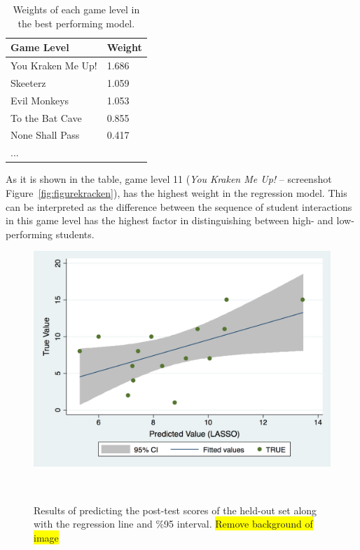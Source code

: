 \documentclass{sigchi}
\newcommand{\hl}[1]{\colorbox{yellow}{#1}}
\begin{document}
\begin{table}[b]
	\centering
	\begin{tabular}{ll}
		\hline
		\textbf{Game Level} & \textbf{Weight} \\ \hline
		You Kraken Me Up!   & 1.686                               \\
		Skeeterz            & 1.059                               \\
		Evil Monkeys        & 1.053                               \\
		To the Bat Cave     & 0.855                               \\
		None Shall Pass     & 0.417                               \\
		...                 &                                    
	\end{tabular}
	\caption{Weights of each game level in the best performing model.}
	\label{tab:regrweights}	
\end{table}

As it is shown in the table, game level 11 (\textit{You Kraken Me Up!} -- screenshot Figure~\ref{fig:figurekracken}), has the highest weight in the regression model. This can be interpreted as the difference between the sequence of student interactions in this game level has the highest factor in distinguishing between high- and low-performing students. 

\begin{figure}
	\centering
	\includegraphics[width=0.9\columnwidth]{figures/regression.png}
	\caption{Results of predicting the post-test scores of the held-out set along with the regression line and \%95 interval. \hl{Remove background of image}}~\label{fig:regression}
\end{figure}
	
\end{document}
